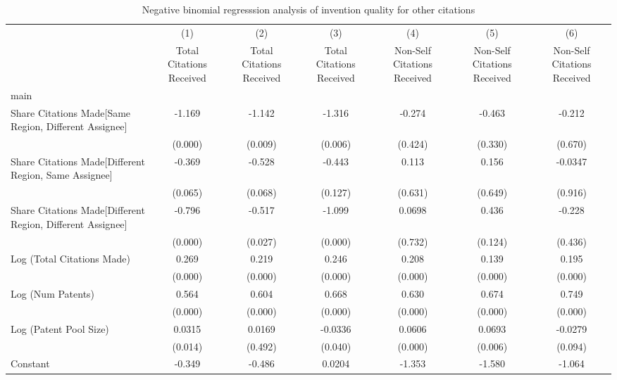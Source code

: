 \begin{table}[htbp]\centering \caption{Negative binomial regresssion analysis of invention quality for other citations \label{o.model123192021}} \begin{tabular}{l*{6}{c}} \hline\hline
                &\multicolumn{1}{c}{(1)}&\multicolumn{1}{c}{(2)}&\multicolumn{1}{c}{(3)}&\multicolumn{1}{c}{(4)}&\multicolumn{1}{c}{(5)}&\multicolumn{1}{c}{(6)}\\
                &\multicolumn{1}{c}{Total Citations Received}&\multicolumn{1}{c}{Total Citations Received}&\multicolumn{1}{c}{Total Citations Received}&\multicolumn{1}{c}{Non-Self Citations Received}&\multicolumn{1}{c}{Non-Self Citations Received}&\multicolumn{1}{c}{Non-Self Citations Received}\\
\hline
main            &         &         &         &         &         &         \\
Share Citations Made[Same Region, Different Assignee]&   -1.169&   -1.142&   -1.316&   -0.274&   -0.463&   -0.212\\
                &  (0.000)&  (0.009)&  (0.006)&  (0.424)&  (0.330)&  (0.670)\\
Share Citations Made[Different Region, Same Assignee]&   -0.369&   -0.528&   -0.443&    0.113&    0.156&  -0.0347\\
                &  (0.065)&  (0.068)&  (0.127)&  (0.631)&  (0.649)&  (0.916)\\
Share Citations Made[Different Region, Different Assignee]&   -0.796&   -0.517&   -1.099&   0.0698&    0.436&   -0.228\\
                &  (0.000)&  (0.027)&  (0.000)&  (0.732)&  (0.124)&  (0.436)\\
Log (Total Citations Made)&    0.269&    0.219&    0.246&    0.208&    0.139&    0.195\\
                &  (0.000)&  (0.000)&  (0.000)&  (0.000)&  (0.000)&  (0.000)\\
Log (Num Patents)&    0.564&    0.604&    0.668&    0.630&    0.674&    0.749\\
                &  (0.000)&  (0.000)&  (0.000)&  (0.000)&  (0.000)&  (0.000)\\
Log (Patent Pool Size)&   0.0315&   0.0169&  -0.0336&   0.0606&   0.0693&  -0.0279\\
                &  (0.014)&  (0.492)&  (0.040)&  (0.000)&  (0.006)&  (0.094)\\
Constant        &   -0.349&   -0.486&   0.0204&   -1.353&   -1.580&   -1.064\\

\end{tabular}
\end{table}
